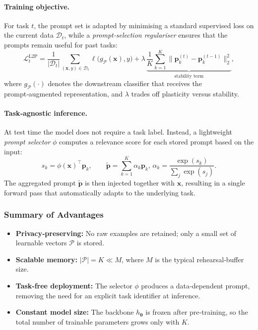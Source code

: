 \documentclass[12pt, a4paper]{article}
\begin{document}
\paragraph{Training objective.}
For task $t$, the prompt set is adapted by minimising a standard supervised loss on the current data $\mathcal D_{t}$, while a \emph{prompt‑selection regulariser} ensures that the prompts remain useful for past tasks:
\[
\mathcal L^{\text{L2P}}_{t}
   = \frac{1}{|\mathcal D_{t}|}\!\sum_{(\mathbf x,y)\in\mathcal D_{t}}
        \ell\!\bigl(g_{\mathcal P}(\mathbf x),y\bigr)
   + \lambda\,
     \underbrace{\frac{1}{K}\sum_{k=1}^{K}
          \bigl\|\mathbf p_{k}^{(t)}-\mathbf p_{k}^{(t-1)}\bigr\|_{2}^{2}}_{\text{stability term}},
\tag{7}
\]
where $g_{\mathcal P}(\cdot)$ denotes the downstream classifier that receives the prompt‑augmented representation, and $\lambda$ trades off plasticity versus stability.

\paragraph{Task‑agnostic inference.}
At test time the model does not require a task label. Instead, a lightweight \emph{prompt selector} $\phi$ computes a relevance score for each stored prompt based on the input:
\[
s_{k} = \phi(\mathbf x)^{\top}\mathbf p_{k},\qquad 
\tilde{\mathbf p} = \sum_{k=1}^{K}\alpha_{k}\mathbf p_{k},\,
\alpha_{k}= \frac{\exp(s_{k})}{\sum_{j}\exp(s_{j})}.
\tag{8}
\]
The aggregated prompt $\tilde{\mathbf p}$ is then injected together with $\mathbf x$, resulting in a single forward pass that automatically adapts to the underlying task.

\subsubsection{Summary of Advantages}
\begin{itemize}
\item \textbf{Privacy‑preserving:} No raw examples are retained; only a small set of learnable vectors $\mathcal P$ is stored.
\item \textbf{Scalable memory:} $|\mathcal P|=K\ll M$, where $M$ is the typical rehearsal‑buffer size.
\item \textbf{Task‑free deployment:} The selector $\phi$ produces a data‑dependent prompt, removing the need for an explicit task identifier at inference.
\item \textbf{Constant model size:} The backbone $h_{\boldsymbol\theta}$ is frozen after pre‑training, so the total number of trainable parameters grows only with $K$.
\end{itemize}
\end{document}
